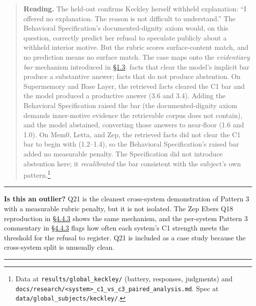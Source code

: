 \begin{quote}
\textbf{Reading.} The held-out confirms Keckley herself withheld
explanation: ``I offered no explanation. The reason is not difficult to
understand.'' The Behavioral Specification's documented-dignity axiom
would, on this question, correctly predict her refusal to speculate
publicly about a withheld interior motive. But the rubric scores
surface-content match, and no prediction means no surface match. The
case maps onto the \emph{evidentiary bar} mechanism introduced in \hyperref[what-we-found]{§1.3}:
facts that clear the model's implicit bar produce a substantive answer;
facts that do not produce abstention. On Supermemory and Base Layer, the
retrieved facts cleared the C1 bar and the model produced a productive
answer (3.6 and 3.4). Adding the Behavioral Specification raised the bar
(the documented-dignity axiom demands inner-motive evidence the
retrievable corpus does not contain), and the model abstained,
converting those answers to near-floor (1.6 and 1.0). On Mem0, Letta,
and Zep, the retrieved facts did not clear the C1 bar to begin with
(1.2--1.4), so the Behavioral Specification's raised bar added no
measurable penalty. The Specification did not introduce abstention here;
it \emph{recalibrated} the bar consistent with the subject's own
pattern.\footnote{Data at \texttt{results/global\_keckley/} (battery,
  responses, judgments) and
  \texttt{docs/research/\textless{}system\textgreater{}\_c1\_vs\_c3\_paired\_analysis.md}.
  Spec at \texttt{data/global\_subjects/keckley/}.}
\end{quote}

\begin{center}\rule{0.5\linewidth}{0.5pt}\end{center}

\textbf{Is this an outlier?} Q21 is the cleanest cross-system
demonstration of Pattern 3 with a measurable rubric penalty, but it is
not isolated. The Zep Ebers Q18 reproduction in \hyperref[where-the-spec-helps-where-it-hurts-and-which-question-types-route-to-each]{§4.4.3} shows the same
mechanism, and the per-system Pattern 3 commentary in \hyperref[where-the-spec-helps-where-it-hurts-and-which-question-types-route-to-each]{§4.4.3} flags how
often each system's C1 strength meets the threshold for the refusal to
register. Q21 is included as a case study because the cross-system split
is unusually clean.

\begin{center}\rule{0.5\linewidth}{0.5pt}\end{center}

